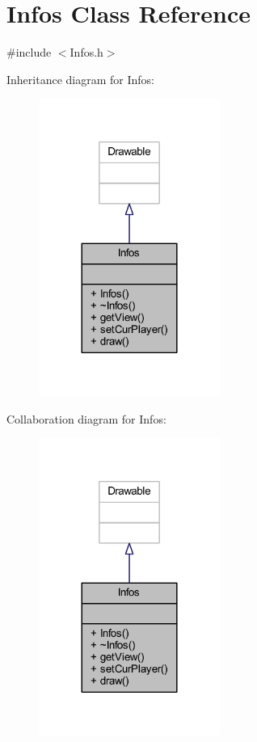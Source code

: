 \hypertarget{class_infos}{}\section{Infos Class Reference}
\label{class_infos}


{\ttfamily \#include $<$Infos.\+h$>$}



Inheritance diagram for Infos\+:
\nopagebreak
\begin{figure}[H]
\begin{center}
\leavevmode
\includegraphics[width=168pt]{class_infos__inherit__graph}
\end{center}
\end{figure}


Collaboration diagram for Infos\+:
\nopagebreak
\begin{figure}[H]
\begin{center}
\leavevmode
\includegraphics[width=168pt]{class_infos__coll__graph}
\end{center}
\end{figure}
